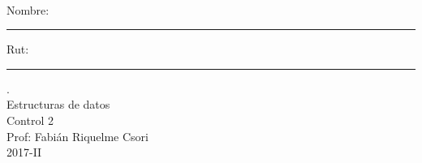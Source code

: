 \documentclass[letter,12pt,oneside]{book}
\theoremstyle{definition}
\begin{document}

\begin{center}
$~$
\end{center}

\noindent
Nombre: \rule{.6\textwidth}{.5pt} Rut: \rule{.24\textwidth}{.5pt}

\begin{center}
 {\Large
  {\color{white}.}\\
  Estructuras de datos\\[1ex]
  Control 2}\\[1.2ex]
  Prof: Fabián Riquelme Csori\\
  2017-II
\end{center}
\end{document}
